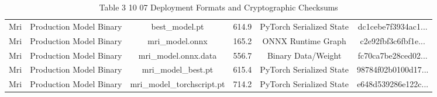 \begin{table}[htbp]
\begin{tabular}{lccccc}
Mri & Production Model Binary & best\_model.pt & 614.9 & PyTorch Serialized State & dc1cebe7f3934ac1... \\
Mri & Production Model Binary & mri\_model.onnx & 165.2 & ONNX Runtime Graph & c2e92fbf3c6fbf1e... \\
Mri & Production Model Binary & mri\_model.onnx.data & 556.7 & Binary Data/Weight & fc70ca7be28ced02... \\
Mri & Production Model Binary & mri\_model\_best.pt & 615.4 & PyTorch Serialized State & 98784f02b0100d17... \\
Mri & Production Model Binary & mri\_model\_torchscript.pt & 714.2 & PyTorch Serialized State & e648d539286e122c... \\
\hline
\end{tabular}
\caption{Table 3 10 07 Deployment Formats and Cryptographic Checksums}
\label{tab:table_3_10_07_deployment_formats_and_cryptographic_checksums}
\end{table}

